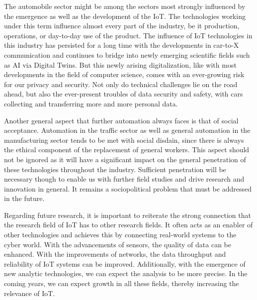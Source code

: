The automobile sector might be among the sectors most strongly influenced by the emergence as well as the development of the IoT. The technologies working under this term influence almost every part of the industry, be it production, operations, or day-to-day use of the product. The influence of IoT technologies in this industry has persisted for a long time with the developments in car-to-X communication and continues to bridge into newly emerging scientific fields such as AI via Digital Twins. But this newly arising digitalization, like with most developments in the field of computer science, comes with an ever-growing risk for our privacy and security. Not only do technical challenges lie on the road ahead, but also the ever-present troubles of data security and safety, with cars collecting and transferring more and more personal data.

Another general aspect that further automation always faces is that of social acceptance. Automation in the traffic sector as well as general automation in the manufacturing sector tends to be met with social disdain, since there is always the ethical component of the replacement of general workers. This aspect should not be ignored as it will have a significant impact on the general penetration of these technologies throughout the industry. Sufficient penetration will be necessary though to enable us with further field studies and drive research and innovation in general. It remains a sociopolitical problem that must be addressed in the future.

Regarding future research, it is important to reiterate the strong connection that the research field of IoT has to other research fields. It often acts as an enabler of other technologies and achieves this by connecting real-world systems to the cyber world. With the advancements of sensors, the quality of data can be enhanced. With the improvements of networks, the data throughput and reliability of IoT systems can be improved. Additionally, with the emergence of new analytic technologies, we can expect the analysis to be more precise. In the coming years, we can expect growth in all these fields, thereby increasing the relevance of IoT.